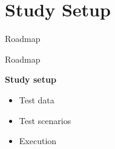 \documentclass[12pt]{beamer}
\newcommand{\tocstyle}[1]{
\Large
\vspace{0.25cm}
\hspace{0.5cm}
\parbox[top][0.66\textheight][c]{0.66\textwidth}{#1}}
\begin{document}
\section{Study Setup}
\begin{frame}{Roadmap}
\tocstyle{\tableofcontents[currentsection]}
\end{frame}

\begin{frame}{Roadmap}
\tocstyle{
\bfseries
Study setup
\large
\begin{itemize}\itemsep5pt \vspace{5pt}
\item Test data
\item Test scenarios
\item Execution
\end{itemize}}
\end{frame}
\end{document}
